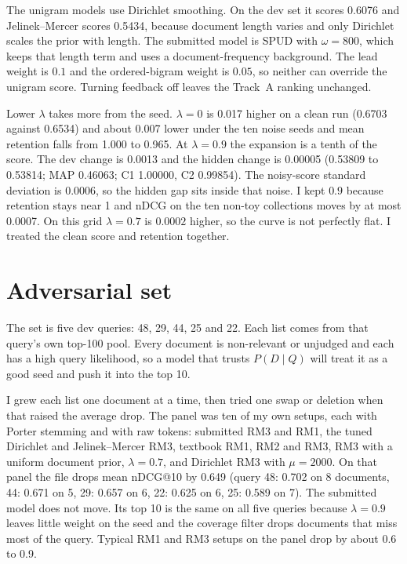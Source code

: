 \documentclass[10pt,a4paper]{article}
\begin{document}
The unigram models use Dirichlet smoothing. On the dev set it scores 0.6076 and Jelinek--Mercer scores 0.5434, because document length varies and only Dirichlet scales the prior with length. The submitted model is SPUD with $\omega{=}800$, which keeps that length term and uses a document-frequency background. The lead weight is $0.1$ and the ordered-bigram weight is $0.05$, so neither can override the unigram score. Turning feedback off leaves the Track~A ranking unchanged.

Lower $\lambda$ takes more from the seed. $\lambda{=}0$ is 0.017 higher on a clean run (0.6703 against 0.6534) and about 0.007 lower under the ten noise seeds and mean retention falls from 1.000 to 0.965. At $\lambda{=}0.9$ the expansion is a tenth of the score. The dev change is 0.0013 and the hidden change is 0.00005 (0.53809 to 0.53814; MAP 0.46063; C1 1.00000, C2 0.99854). The noisy-score standard deviation is 0.0006, so the hidden gap sits inside that noise. I kept $0.9$ because retention stays near 1 and nDCG on the ten non-toy collections moves by at most 0.0007. On this grid $\lambda{=}0.7$ is $0.0002$ higher, so the curve is not perfectly flat. I treated the clean score and retention together.


\section{Adversarial set}

The set is five dev queries: 48, 29, 44, 25 and 22. Each list comes from that query's own top-100 pool. Every document is non-relevant or unjudged and each has a high query likelihood, so a model that trusts $P(D\mid Q)$ will treat it as a good seed and push it into the top 10.

I grew each list one document at a time, then tried one swap or deletion when that raised the average drop. The panel was ten of my own setups, each with Porter stemming and with raw tokens: submitted RM3 and RM1, the tuned Dirichlet and Jelinek--Mercer RM3, textbook RM1, RM2 and RM3, RM3 with a uniform document prior, $\lambda = 0.7$, and Dirichlet RM3 with $\mu = 2000$. On that panel the file drops mean nDCG@10 by 0.649 (query 48: 0.702 on 8 documents, 44: 0.671 on 5, 29: 0.657 on 6, 22: 0.625 on 6, 25: 0.589 on 7). The submitted model does not move. Its top 10 is the same on all five queries because $\lambda = 0.9$ leaves little weight on the seed and the coverage filter drops documents that miss most of the query. Typical RM1 and RM3 setups on the panel drop by about 0.6 to 0.9.
\end{document}
